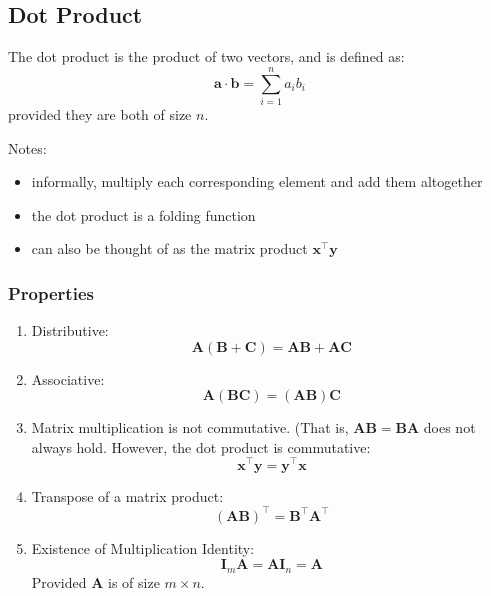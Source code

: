 \documentclass[11pt,twocolumn]{report}
\begin{document}
\subsection{Dot Product}
The dot product is the product of two vectors, and is defined as:
\begin{equation}
  \bm{a} \cdot \bm{b} = \sum_{i = 1}^n a_ib_i
\end{equation}
provided they are both of size $n$.\par
Notes:
\begin{itemize}
  \item informally, multiply each corresponding element and add them altogether
  \item the dot product is a folding function
  \item can also be thought of as the matrix product $\bm{x}^\intercal\bm{y}$
\end{itemize}
\subsubsection{Properties}
\begin{enumerate}
  \item Distributive: 
    \begin{equation}
      \bm{A}(\bm{B} + \bm{C}) = \bm{AB} + \bm{AC}
    \end{equation}
  \item Associative:
    \begin{equation}
      \bm{A}(\bm{BC}) = (\bm{AB})\bm{C}
    \end{equation}
  \item Matrix multiplication is not commutative. (That is, $\bm{AB} = \bm{BA}$
    does not always hold. However, the dot product is commutative:
    \begin{equation}
      \bm{x}^\intercal\bm{y} = \bm{y}^\intercal\bm{x}
    \end{equation}
  \item Transpose of a matrix product:
    \begin{equation}
      (\bm{AB})^\intercal = \bm{B}^\intercal\bm{A}^\intercal
    \end{equation}
  \item Existence of Multiplication Identity:
    \begin{equation}
      \bm{I}_m\bm{A} = \bm{A}\bm{I}_n = \bm{A}
    \end{equation}
    Provided $\bm{A}$ is of size $m \times n$.
\end{enumerate}
\end{document}
